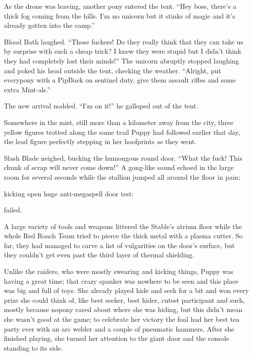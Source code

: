 As the drone was leaving, another pony entered the tent. ``Hey boss, there's a thick fog coming from the hills. I'm no unicorn but it stinks of magic and it's already gotten into the camp.''

Blood Bath laughed. ``Those fuckers! Do they really think that they can take us by surprise with such a cheap trick? I knew they were stupid but I didn't think they had completely lost their minds!'' The unicorn abruptly stopped laughing and poked his head outside the tent, checking the weather. ``Alright, put everypony with a PipBuck on sentinel duty, give them assault rifles and some extra Mint-als.''

The new arrival nodded. ``I'm on it!'' he galloped out of the tent.

Somewhere in the mist, still more than a kilometer away from the city, three yellow figures trotted along the same trail Puppy had followed earlier that day, the lead figure perfectly stepping in her hoofprints as they went.

\horizonline


Slash Blade neighed, bucking the humongous round door. ``What the fuck! This chunk of scrap will never come down!'' A gong-like sound echoed in the large room for several seconds while the stallion jumped all around the floor in pain; 

\begin{center}
    kicking open huge anti-megaspell door test: 
    
    failed.
\end{center}

A large variety of tools and weapons littered the Stable's atrium floor while the whole Red Roach Team tried to pierce the thick metal with a plasma cutter. So far, they had managed to carve a list of vulgarities on the door's surface, but they couldn't get even past the third layer of thermal shielding.

Unlike the raiders, who were mostly swearing and kicking things, Puppy was having a great time; that crazy spanker was nowhere to be seen and this place was big and full of toys. She already played hide and seek for a bit and won every prize she could think of, like best seeker, best hider, cutest participant and such, mostly because nopony cared about where she was hiding, but this didn't mean she wasn't good at the game; to celebrate her victory the foal had her best tea party ever with an arc welder and a couple of pneumatic hammers. After she finished playing, she turned her attention to the giant door and the console standing to its side.

